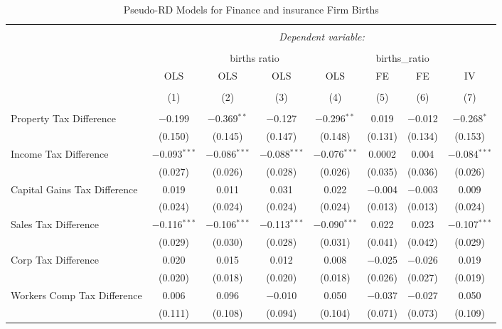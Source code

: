 
\begin{table}[!htbp] \centering 
  \caption{Pseudo-RD Models for  Finance and insurance Firm Births} 
  \label{} 
\begin{tabular}{@{\extracolsep{5pt}}lccccccc} 
\\[-1.8ex]\hline 
\hline \\[-1.8ex] 
 & \multicolumn{7}{c}{\textit{Dependent variable:}} \\ 
\cline{2-8} 
\\[-1.8ex] & \multicolumn{4}{c}{births ratio} & \multicolumn{2}{c}{births\_ratio} &   \\ 
 & OLS & OLS & OLS & OLS & FE & FE & IV \\ 
\\[-1.8ex] & (1) & (2) & (3) & (4) & (5) & (6) & (7)\\ 
\hline \\[-1.8ex] 
 Property Tax Difference & $-$0.199 & $-$0.369$^{**}$ & $-$0.127 & $-$0.296$^{**}$ & 0.019 & $-$0.012 & $-$0.268$^{*}$ \\ 
  & (0.150) & (0.145) & (0.147) & (0.148) & (0.131) & (0.134) & (0.153) \\ 
  Income Tax Difference & $-$0.093$^{***}$ & $-$0.086$^{***}$ & $-$0.088$^{***}$ & $-$0.076$^{***}$ & 0.0002 & 0.004 & $-$0.084$^{***}$ \\ 
  & (0.027) & (0.026) & (0.028) & (0.026) & (0.035) & (0.036) & (0.026) \\ 
  Capital Gains Tax Difference & 0.019 & 0.011 & 0.031 & 0.022 & $-$0.004 & $-$0.003 & 0.009 \\ 
  & (0.024) & (0.024) & (0.024) & (0.024) & (0.013) & (0.013) & (0.024) \\ 
  Sales Tax Difference & $-$0.116$^{***}$ & $-$0.106$^{***}$ & $-$0.113$^{***}$ & $-$0.090$^{***}$ & 0.022 & 0.023 & $-$0.107$^{***}$ \\ 
  & (0.029) & (0.030) & (0.028) & (0.031) & (0.041) & (0.042) & (0.029) \\ 
  Corp Tax Difference & 0.020 & 0.015 & 0.012 & 0.008 & $-$0.025 & $-$0.026 & 0.019 \\ 
  & (0.020) & (0.018) & (0.020) & (0.018) & (0.026) & (0.027) & (0.019) \\ 
  Workers Comp Tax Difference & 0.006 & 0.096 & $-$0.010 & 0.050 & $-$0.037 & $-$0.027 & 0.050 \\ 
  & (0.111) & (0.108) & (0.094) & (0.104) & (0.071) & (0.073) & (0.109) \\ 

\end{tabular}
\end{table}
